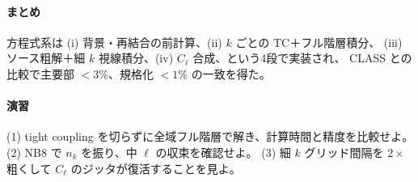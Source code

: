 \paragraph{まとめ}
方程式系は (i) 背景・再結合の前計算、(ii) $k$ ごとの TC＋フル階層積分、
(iii) ソース粗解＋細 $k$ 視線積分、(iv) $C_\ell$ 合成、という4段で実装され、
CLASS との比較で主要部 $<3\%$、規格化 $<1\%$ の一致を得た。

\paragraph{演習}
(1) tight coupling を切らずに全域フル階層で解き、計算時間と精度を比較せよ。
(2) NB8 で $n_k$ を振り、中 $\ell$ の収束を確認せよ。
(3) 細 $k$ グリッド間隔を $2\times$ 粗くして $C_\ell$ のジッタが復活することを見よ。
